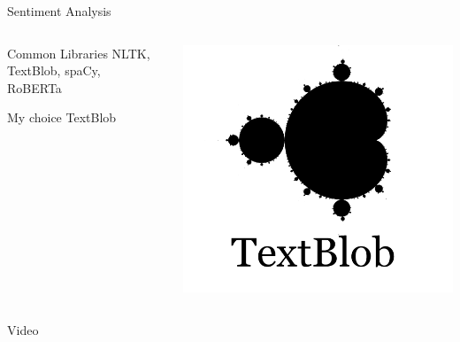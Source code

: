\documentclass{beamer}
\begin{document}
	\begin{frame}{Sentiment Analysis}
		 \begin{columns}[T]
			\begin{column}{.5\textwidth}
				\begin{block}{Common Libraries}
					NLTK, TextBlob, spaCy, RoBERTa\
				\end{block}
				\vspace{0.5cm}
				\begin{block}{My choice}
					TextBlob
				\end{block}
			\end{column}
			\begin{column}{.5\textwidth}
					\includegraphics[width=\textwidth]{textblob.png}
			\end{column}
		\end{columns}
		
	\end{frame}
	
	\begin{frame}{Video}
		\centering
	\end{frame}
	
\end{document}
